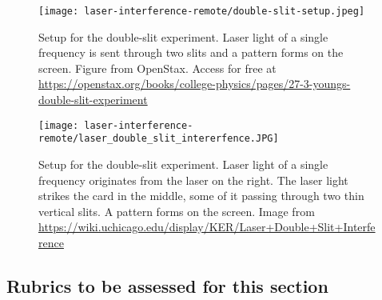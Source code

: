 \begin{figure}
	\centering
	\texttt{[image: laser-interference-remote/double-slit-setup.jpeg]}
	\caption{Setup for the double-slit experiment. Laser light of a single frequency is sent through
		two slits and a pattern forms on the screen. Figure from OpenStax. Access for free at \url{https://openstax.org/books/college-physics/pages/27-3-youngs-double-slit-experiment}}\label{lir:fig:setup}
\end{figure}

\begin{figure}
	\centering
	\texttt{[image: laser-interference-remote/laser\_double\_slit\_intererfence.JPG]}
	\caption{Setup for the double-slit experiment. Laser light of a single frequency originates from the laser on the right. The laser light strikes the card in the middle, some of it passing through two thin vertical slits. A pattern forms on the screen. Image from \url{https://wiki.uchicago.edu/display/KER/Laser+Double+Slit+Interference} }\label{lir:fig:setup-photo}
\end{figure}


%	

\subsection{Rubrics to be assessed for this section}

